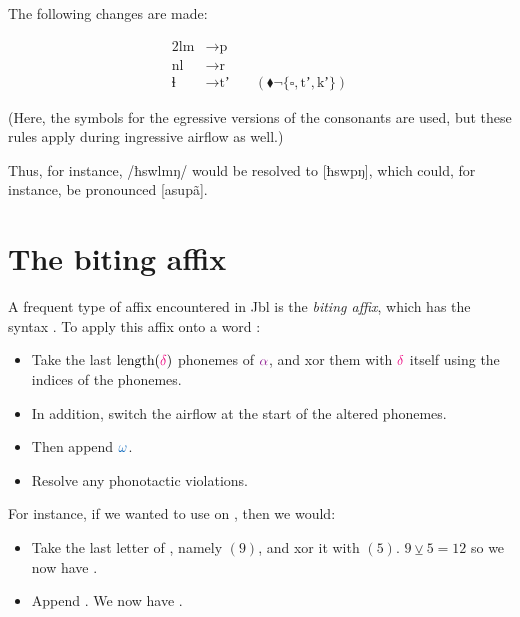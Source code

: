 \documentclass{book}
\newcommand{\lname}{Jbl}
\begin{document}
The following changes are made:

\begin{alignat*}{2}
  \text{lm} &\rightarrow \text{p} &\quad \\
  \text{nl} &\rightarrow \text{r} &\quad \\
  \text{ɬ} &\rightarrow \text{tʼ} &\quad(\blacklozenge \lnot \{\square, \text{tʼ}, \text{kʼ}\})
\end{alignat*}

(Here, the symbols for the egressive versions of the consonants are used, but these rules apply during ingressive airflow as well.)

Thus, for instance, /ħswlmŋ/ would be resolved to [ħswpŋ], which could, for instance, be pronounced [asupã].

\section{The biting affix}

A frequent type of affix encountered in \lname{} is the \emph{biting affix}, which has the syntax \hortho{->\hliv{$\delta$}:\hliii{$\omega$}}. To apply this affix onto a word \hli{$\alpha$}:

\begin{itemize}
  \item Take the last $\text{length}(\hliv{\delta})$ phonemes of $\hli{\alpha}$, and xor them with $\hliv{\delta}$ itself using the indices of the phonemes.
  \item In addition, switch the airflow at the start of the altered phonemes.
  \item Then append $\hliii{\omega}$.
  \item Resolve any phonotactic violations.
\end{itemize}

For instance, if we wanted to use  on , then we would:

\begin{itemize}
  \item Take the last letter of , namely  $(9)$, and xor it with  $(5)$. $9 \veebar 5 = 12$ so we now have .
  \item Append . We now have .
\end{itemize}
\end{document}
